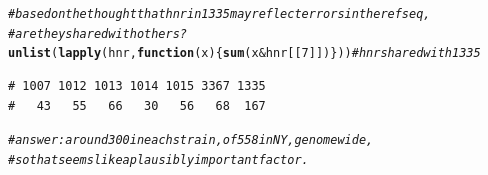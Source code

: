 \documentclass{article}\usepackage[]{graphicx}\usepackage[]{color}
\makeatletter
\newcommand{\hlnum}[1]{\textcolor[rgb]{0.686,0.059,0.569}{#1}}%
\newcommand{\hlcom}[1]{\textcolor[rgb]{0.678,0.584,0.686}{\textit{#1}}}%
\newcommand{\hlopt}[1]{\textcolor[rgb]{0,0,0}{#1}}%
\newcommand{\hlstd}[1]{\textcolor[rgb]{0.345,0.345,0.345}{#1}}%
\newcommand{\hlkwa}[1]{\textcolor[rgb]{0.161,0.373,0.58}{\textbf{#1}}}%
\newcommand{\hlkwc}[1]{\textcolor[rgb]{0.333,0.667,0.333}{#1}}%
\newcommand{\hlkwd}[1]{\textcolor[rgb]{0.737,0.353,0.396}{\textbf{#1}}}%
\newenvironment{kframe}{%
 \def\at@end@of@kframe{}%
 \ifinner\ifhmode%
  \def\at@end@of@kframe{\end{minipage}}%
  \begin{minipage}{\columnwidth}%
 \fi\fi%
 \def\FrameCommand##1{\hskip\@totalleftmargin \hskip-\fboxsep
 \colorbox{shadecolor}{##1}\hskip-\fboxsep
     \hskip-\linewidth \hskip-\@totalleftmargin \hskip\columnwidth}%
 \MakeFramed {\advance\hsize-\width
   \@totalleftmargin\z@ \linewidth\hsize
   \@setminipage}}%
 {\par\unskip\endMakeFramed%
 \at@end@of@kframe}
\newenvironment{knitrout}{}{} %
\makeatother
\begin{document}
\begin{knitrout}\footnotesize
{}\color{fgcolor}\begin{kframe}
\begin{alltt}
\hlcom{# based on the thought that hnr in 1335 may reflect errors in the ref seq, }
\hlcom{# are they shared with others?}
\hlkwd{unlist}\hlstd{(}\hlkwd{lapply}\hlstd{(hnr,} \hlkwa{function}\hlstd{(}\hlkwc{x}\hlstd{)\{}\hlkwd{sum}\hlstd{(x} \hlopt{&} \hlstd{hnr[[}\hlnum{7}\hlstd{]])\}))}                 \hlcom{# hnr shared with 1335}
\end{alltt}
\begin{verbatim}
# 1007 1012 1013 1014 1015 3367 1335 
#   43   55   66   30   56   68  167
\end{verbatim}
\begin{alltt}
\hlcom{# answer: around 300 in each strain, of 558 in NY, genomewide, }
\hlcom{# so that seems like a plausibly important factor.}


\end{alltt}
\end{kframe}
\end{knitrout}
\end{document}
